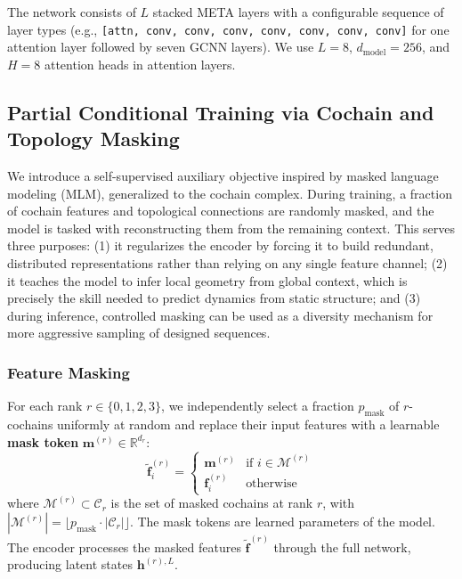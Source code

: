 \documentclass{article}
\begin{document}
The network consists of $L$ stacked META layers with a configurable sequence of layer types (e.g., \texttt{[attn, conv, conv, conv, conv, conv, conv, conv]} for one attention layer followed by seven GCNN layers). We use $L = 8$, $d_{\text{model}} = 256$, and $H = 8$ attention heads in attention layers.

\subsection{Partial Conditional Training via Cochain and Topology Masking}

We introduce a self-supervised auxiliary objective inspired by masked language modeling (MLM), generalized to the cochain complex. During training, a fraction of cochain features and topological connections are randomly masked, and the model is tasked with reconstructing them from the remaining context. This serves three purposes: (1) it regularizes the encoder by forcing it to build redundant, distributed representations rather than relying on any single feature channel; (2) it teaches the model to infer local geometry from global context, which is precisely the skill needed to predict dynamics from static structure; and (3) during inference, controlled masking can be used as a diversity mechanism for more aggressive sampling of designed sequences.

\subsubsection{Feature Masking}

For each rank $r \in \{0, 1, 2, 3\}$, we independently select a fraction $p_{\text{mask}}$ of $r$-cochains uniformly at random and replace their input features with a learnable \textbf{mask token} $\mathbf{m}^{(r)} \in \mathbb{R}^{d_r}$:
\begin{equation}
    \tilde{\mathbf{f}}_i^{(r)} = \begin{cases} \mathbf{m}^{(r)} & \text{if } i \in \mathcal{M}^{(r)} \\ \mathbf{f}_i^{(r)} & \text{otherwise} \end{cases}
\end{equation}
where $\mathcal{M}^{(r)} \subset \mathcal{C}_r$ is the set of masked cochains at rank $r$, with $|\mathcal{M}^{(r)}| = \lfloor p_{\text{mask}} \cdot |\mathcal{C}_r| \rfloor$. The mask tokens are learned parameters of the model. The encoder processes the masked features $\tilde{\mathbf{f}}^{(r)}$ through the full network, producing latent states $\mathbf{h}^{(r),L}$.
\end{document}
